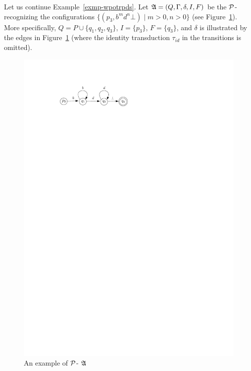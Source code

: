 \begin{example}
Let us continue Example~\ref{exmp-wpotrpds}. Let ${\mathfrak{A} } = (Q, \Gamma, \delta, I, F)$ be the ${\mathcal{P} }$-{\WOTrNFA} recognizing the configurations $\{(p_3, b^m d^n \bot) \mid m > 0, n > 0\}$ (see Figure~\ref{fig-pnfa-exmp}). More specifically, $Q= P \cup \{q_1, q_2, q_3\}$, $I = \{p_3\}$, $F= \{q_3\}$, and $\delta$ is illustrated by the edges in Figure~\ref{fig-pnfa-exmp} (where the identity transduction $\tau_{id}$ in the transitions is omitted).  
%
\begin{figure}[htb]
    \centering
	\includegraphics[scale = 0.9]{pnfa-example.pdf}
	\caption{An example of ${\mathcal{P} }$-{\WOTrNFA} ${\mathfrak{A} }$}\label{fig-pnfa-exmp}
\end{figure}


\end{example}
